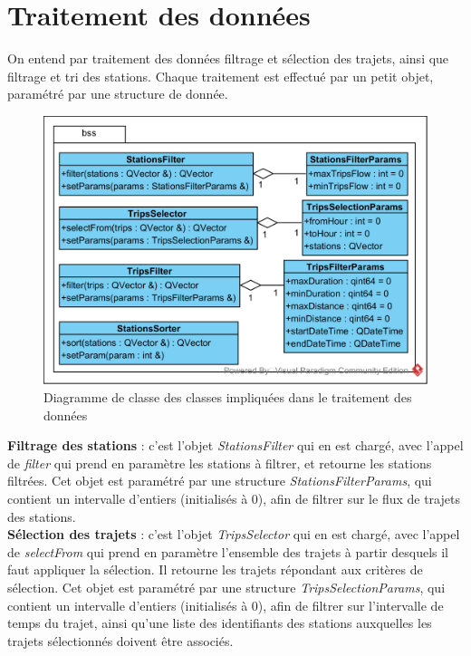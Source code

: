 \documentclass[12pt]{article}
\begin{document}
\newpage
	\section{Traitement des données}
	On entend par traitement des données filtrage et sélection des trajets, ainsi que filtrage et tri des stations. Chaque traitement est effectué par un petit objet, paramétré par une structure de donnée.
	
	\begin{figure}[!h]
	\begin{center}
	\includegraphics[scale=1]{dia_class_filtres.png}
	\caption{Diagramme de classe des classes impliquées dans le traitement des données}
	\end{center}
	\end{figure}
	
	\textbf{Filtrage des stations} : c’est l’objet \textit{StationsFilter} qui en est chargé, avec l’appel de \textit{filter} qui prend en paramètre les stations à filtrer, et retourne les stations filtrées. Cet objet est paramétré par une structure \textit{StationsFilterParams}, qui contient un intervalle d’entiers (initialisés à 0), afin de filtrer sur le flux de trajets des stations.\\

	\textbf{Sélection des trajets} : c’est l’objet \textit{TripsSelector} qui en est chargé, avec l’appel de \textit{selectFrom} qui prend en paramètre l’ensemble des trajets à partir desquels il faut appliquer la sélection. Il retourne les trajets répondant aux critères de sélection. Cet objet est paramétré par une structure \textit{TripsSelectionParams}, qui contient un intervalle d’entiers (initialisés à 0), afin de filtrer sur l’intervalle de temps du trajet, ainsi qu’une liste des identifiants des stations auxquelles les trajets sélectionnés doivent être associés.\\
\end{document}
